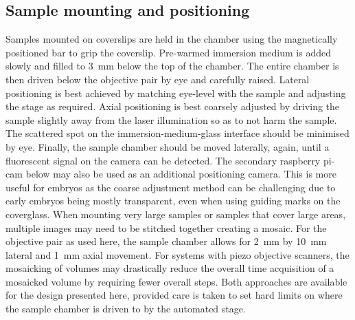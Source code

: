 \subsection{Sample mounting and positioning}

Samples mounted on coverslips are held in the chamber using the magnetically positioned bar to grip the coverslip.
Pre-warmed immersion medium is added slowly and filled to \SI{3}{\milli\meter} below the top of the chamber.
The entire chamber is then driven below the objective pair by eye and carefully raised.
Lateral positioning is best achieved by matching eye-level with the sample and adjusting the stage as required.
Axial positioning is best coarsely adjusted by driving the sample slightly away from the laser illumination so as to not harm the sample.
The scattered spot on the immersion-medium-glass interface should be minimised by eye.
Finally, the sample chamber should be moved laterally, again, until a fluorescent signal on the camera can be detected.
The secondary raspberry pi-cam below may also be used as an additional positioning camera.
This is more useful for embryos as the coarse adjustment method can be challenging due to early embryos being mostly transparent, even when using guiding marks on the coverglass.
When mounting very large samples or samples that cover large areas, multiple images may need to be stitched together creating a mosaic.
For the objective pair as used here, the sample chamber allows for \SI{2}{\milli\metre} by \SI{10}{\milli\metre} lateral and \SI{1}{\milli\metre} axial movement.
For systems with piezo objective scanners, the mosaicking of volumes may drastically reduce the overall time acquisition of a mosaicked volume by requiring fewer overall steps.
Both approaches are available for the design presented here, provided care is taken to set hard limits on where the sample chamber is driven to by the automated stage.

